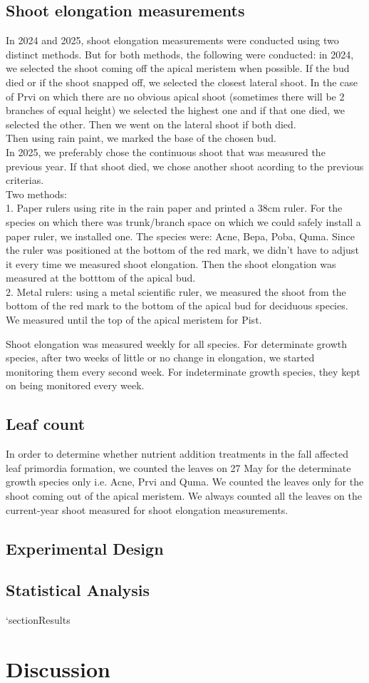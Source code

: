 \documentclass{article}
\begin{document}
\subsection{Shoot elongation measurements}
In 2024 and 2025, shoot elongation measurements were conducted using two distinct methods. But for both methods, the following were conducted: in 2024, we selected the shoot coming off the apical meristem when possible. If the bud died or if the shoot snapped off, we selected the closest lateral shoot. In the case of Prvi on which there are no obvious apical shoot (sometimes there will be 2 branches of equal height) we selected the highest one and if that one died, we selected the other. Then we went on the lateral shoot if both died.\\
Then using rain paint, we marked the base of the chosen bud.\\
In 2025, we preferably chose the continuous shoot that was measured the previous year. If that shoot died, we chose another shoot acording to the previous criterias. \\
Two methods:\\
  1. Paper rulers using rite in the rain paper and printed a 38cm ruler. For the species on which there was trunk/branch space on which we could safely install a paper ruler, we installed one. The species were: Acne, Bepa, Poba, Quma. Since the ruler was positioned at the bottom of the red mark, we didn't have to adjust it every time we measured shoot elongation. Then the shoot elongation was measured at the botttom of the apical bud. \\
  2. Metal rulers: using a metal scientific ruler, we measured the shoot from the bottom of the red mark to the bottom of the apical bud for deciduous species.  We measured until the top of the apical meristem for Pist.
   
Shoot elongation was measured weekly for all species. For determinate growth species, after two weeks of little or no change in elongation, we started monitoring them every second week. For indeterminate growth species, they kept on being monitored every week. 
\subsection{Leaf count}
In order to determine whether nutrient addition treatments in the fall affected leaf primordia formation, we counted the leaves on 27 May for the determinate growth species only i.e. Acne, Prvi and Quma. We counted the leaves only for the shoot coming out of the apical meristem. We always counted all the leaves on the current-year shoot measured for shoot elongation measurements.

\subsection{Experimental Design}

\subsection{Statistical Analysis}
`section{Results}
\section{Discussion}

\printbibliography
\end{document}
